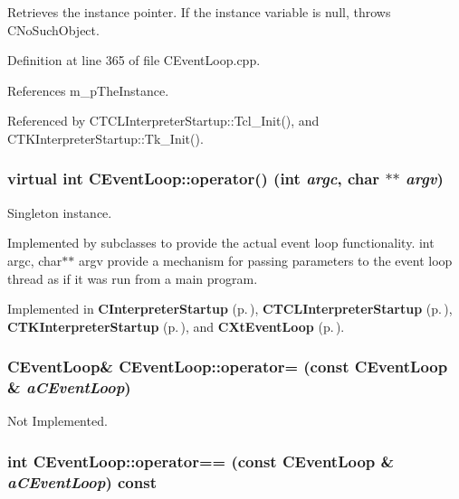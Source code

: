 Retrieves the instance pointer. If the instance variable is null, throws CNo\-Such\-Object. 

Definition at line 365 of file CEvent\-Loop.cpp.

References m\_\-p\-The\-Instance.

Referenced by CTCLInterpreter\-Startup::Tcl\_\-Init(), and CTKInterpreter\-Startup::Tk\_\-Init().
\subsubsection{\setlength{\rightskip}{0pt plus 5cm}virtual int CEvent\-Loop::operator() (int {\em argc}, char $\ast$$\ast$ {\em argv})\hspace{0.3cm}{\tt  [private, pure virtual]}}\label{classCEventLoop_c0}


Singleton instance.

Implemented by subclasses to provide the actual event loop functionality. int argc, char$\ast$$\ast$ argv provide a mechanism for passing parameters to the event loop thread as if it was run from a main program. 

Implemented in {\bf CInterpreter\-Startup} {\rm (p.\,\pageref{classCInterpreterStartup_c0})}, {\bf CTCLInterpreter\-Startup} {\rm (p.\,\pageref{classCTCLInterpreterStartup_c0})}, {\bf CTKInterpreter\-Startup} {\rm (p.\,\pageref{classCTKInterpreterStartup_c3})}, and {\bf CXt\-Event\-Loop} {\rm (p.\,\pageref{classCXtEventLoop_c0})}.
\subsubsection{\setlength{\rightskip}{0pt plus 5cm}CEvent\-Loop\& CEvent\-Loop::operator= (const CEvent\-Loop \& {\em a\-CEvent\-Loop})\hspace{0.3cm}{\tt  [private]}}\label{classCEventLoop_c2}


Not Implemented.

\subsubsection{\setlength{\rightskip}{0pt plus 5cm}int CEvent\-Loop::operator== (const CEvent\-Loop \& {\em a\-CEvent\-Loop}) const\hspace{0.3cm}{\tt  [private]}}\label{classCEventLoop_c3}



